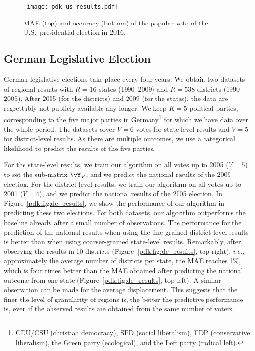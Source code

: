 \begin{figure}
	\centering
	\texttt{[image: pdk-us-results.pdf]}
	\caption{MAE (top) and accuracy (bottom) of the popular vote of the U.S.\ presidential election in 2016.}
	\label{pdk:fig:us_results}
\end{figure}

\subsection{German Legislative Election}

German legislative elections take place every four years.
We obtain two datasets~\cite{norsk2020germany} of regional results with $R=16$ states (1990--2009) and $R=538$ districts (1990--2005).
After 2005 (for the districts) and 2009 (for the states), the data are regrettably not publicly available any longer.
We keep $K = 5$ political parties, corresponding to the five major parties in Germany\footnote{CDU/CSU (christian democracy), SPD (social liberalism), FDP (conservative liberalism), the Green party (ecological), and the Left party (radical left).} for which we have data over the whole period.
The datasets cover $V=6$ votes for state-level results and $V=5$ for district-level results.
As there are multiple outcomes, we use a categorical likelihood to predict the results of the five parties.

For the state-level results, we train our algorithm on all votes up to 2005 ($V = 5$) to set the sub-matrix $\vY_V$, and we predict the national results of the 2009 election.
For the district-level results, we train our algorithm on all votes up to 2001 ($V = 4$), and we predict the national results of the 2005 election.
In Figure~\ref{pdk:fig:de_results}, we show the performance of our algorithm in predicting these two elections.
For both datasets, our algorithm outperforms the baseline already after a small number of observations.
The performance for the prediction of the national results when using the fine-grained district-level results is better than when using coarser-grained state-level results.
Remarkably, after observing the results in 10 districts (Figure~\ref{pdk:fig:de_results}, top right), \textit{i.e.}, approximately the average number of districts per state, the MAE reaches 1\%, which is four times better than the MAE obtained after predicting the national outcome from one state (Figure~\ref{pdk:fig:de_results}, top left).
A similar observation can be made for the average displacement.
This suggests that the finer the level of granularity of regions is, the better the predictive performance is, even if the observed results are obtained from the same number of voters.

